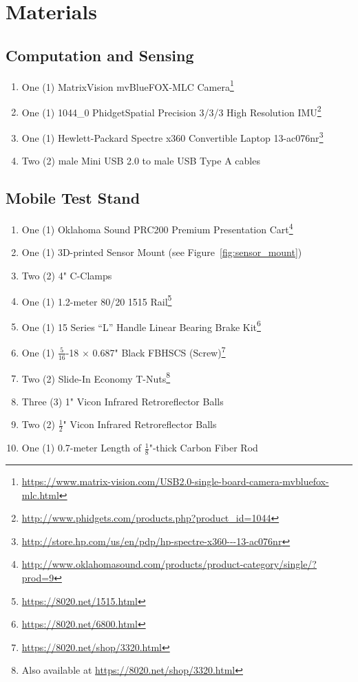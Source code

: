 \clearpage

\section{Materials}
\subsection{Computation and Sensing}
\begin{enumerate}
\item One (1) MatrixVision mvBlueFOX-MLC Camera\footnote{\url{https://www.matrix-vision.com/USB2.0-single-board-camera-mvbluefox-mlc.html}}
\item One (1) 1044\_0 PhidgetSpatial Precision 3/3/3 High Resolution IMU\footnote{\url{http://www.phidgets.com/products.php?product_id=1044}}
\item One (1) Hewlett-Packard Spectre x360 Convertible Laptop 13-ac076nr\footnote{\url{http://store.hp.com/us/en/pdp/hp-spectre-x360---13-ac076nr}}
\item Two (2) male Mini USB 2.0 to male USB Type A cables
\end{enumerate}

\clearpage

\subsection{Mobile Test Stand}
\begin{enumerate}
\item One (1) Oklahoma Sound PRC200 Premium Presentation Cart\footnote{\url{http://www.oklahomasound.com/products/product-category/single/?prod=9}}
\item One (1) 3D-printed Sensor Mount (see Figure~\ref{fig:sensor_mount})
\item Two (2) 4" C-Clamps
\item One (1) 1.2-meter 80/20 1515 Rail\footnote{\url{https://8020.net/1515.html}}
\item One (1) 15 Series ``L'' Handle Linear Bearing Brake Kit\footnote{\url{https://8020.net/6800.html}}
\item One (1) $\frac{5}{16}$-18 $\times$ 0.687" Black FBHSCS (Screw)\footnote{\url{https://8020.net/shop/3320.html}}
\item Two (2) Slide-In Economy T-Nuts\footnote{Also available at \url{https://8020.net/shop/3320.html}}
\item Three (3) 1" Vicon Infrared Retroreflector Balls
\item Two (2) $\frac{1}{2}$" Vicon Infrared Retroreflector Balls
\item One (1) 0.7-meter Length of $\frac{1}{8}$"-thick Carbon Fiber Rod
\end{enumerate}

